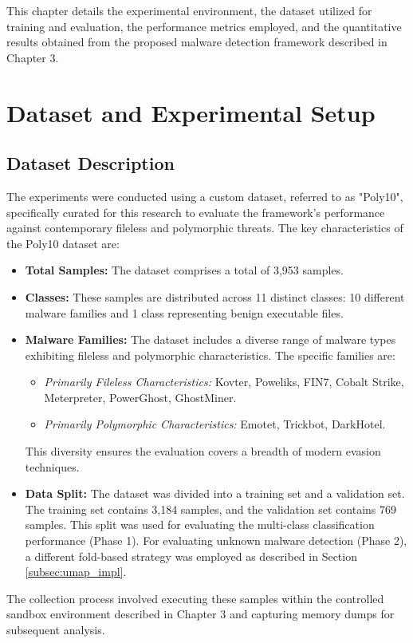 This chapter details the experimental environment, the dataset utilized for training and evaluation, the performance metrics employed, and the quantitative results obtained from the proposed malware detection framework described in Chapter 3.

\section{Dataset and Experimental Setup}
\label{sec:dataset_setup}

\subsection{Dataset Description}
\label{subsec:dataset}

The experiments were conducted using a custom dataset, referred to as "Poly10", specifically curated for this research to evaluate the framework's performance against contemporary fileless and polymorphic threats. The key characteristics of the Poly10 dataset are:
\begin{itemize}
    \item \textbf{Total Samples:} The dataset comprises a total of 3,953 samples.
    \item \textbf{Classes:} These samples are distributed across 11 distinct classes: 10 different malware families and 1 class representing benign executable files.
    \item \textbf{Malware Families:} The dataset includes a diverse range of malware types exhibiting fileless and polymorphic characteristics. The specific families are:
        \begin{itemize}
            \item \textit{Primarily Fileless Characteristics:} Kovter, Poweliks, FIN7, Cobalt Strike, Meterpreter, PowerGhost, GhostMiner.
            \item \textit{Primarily Polymorphic Characteristics:} Emotet, Trickbot, DarkHotel.
        \end{itemize}
        This diversity ensures the evaluation covers a breadth of modern evasion techniques.
    \item \textbf{Data Split:} The dataset was divided into a training set and a validation set. The training set contains 3,184 samples, and the validation set contains 769 samples. This split was used for evaluating the multi-class classification performance (Phase 1). For evaluating unknown malware detection (Phase 2), a different fold-based strategy was employed as described in Section \ref{subsec:umap_impl}.
\end{itemize}
The collection process involved executing these samples within the controlled sandbox environment described in Chapter 3 and capturing memory dumps for subsequent analysis.

